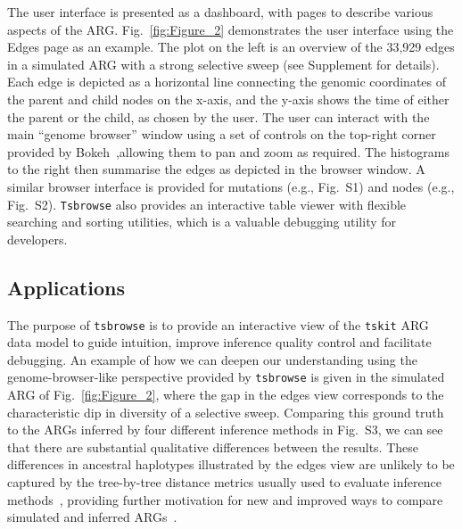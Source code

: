 \documentclass[unnumsec,webpdf,contemporary,large,namedate]{oup-authoring-template}%
\begin{document}
The user interface is presented as a dashboard, with pages to
describe various aspects of the ARG.
Fig.~\ref{fig:Figure_2}
demonstrates the user interface using the Edges page as an example.
The plot on the left is an overview of the 33,929 edges
in a simulated ARG with a strong selective sweep (see
Supplement for details).
Each edge is depicted as a horizontal line connecting the genomic coordinates
of the
parent and child nodes on the x-axis, and the y-axis shows the time of
either the parent or the child, as chosen by the user.
The user can interact with the main ``genome browser'' window
using a set of controls on the top-right corner provided by 
Bokeh~\citep{bokeh},allowing them to pan and zoom as required. 
The histograms to the
right then summarise the edges as depicted in the browser window.
A similar browser interface is provided for
mutations
(e.g., Fig.~S1)
and nodes
(e.g., Fig.~S2).
\texttt{Tsbrowse} also provides an interactive table viewer with flexible
searching and sorting utilities, which is a valuable debugging utility for
developers.


\subsection{Applications}
The purpose of \texttt{tsbrowse} is to provide an interactive view of the
\texttt{tskit} ARG data model to guide intuition, improve inference quality
control and facilitate debugging. An example of how we can deepen our understanding
using the genome-browser-like perspective provided by \texttt{tsbrowse}
is given in the simulated ARG of Fig.~\ref{fig:Figure_2}, where
the gap in the edges view corresponds to the characteristic dip in diversity
of a selective sweep. Comparing this ground truth to the ARGs inferred
by four different inference methods in Fig.~S3,
we can see that there are substantial qualitative differences between the
results. These differences in ancestral haplotypes illustrated by
the edges view are unlikely to be captured by the tree-by-tree distance
metrics usually used to evaluate
inference methods~\citep[e.g.][]{kelleher2019inferring,zhang2023biobank},
providing further motivation for new and improved ways to compare
simulated and inferred ARGs~\citep{fritze2024forest}.
\end{document}

